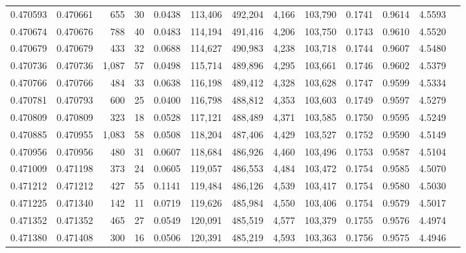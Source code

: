 \begin{tabular}{rrrrrrrrrrrrr}
0.470593 & 0.470661 &   655 &    30 &                                     0.0438 & 113,406 & 492,204 &   4,166 & 103,790 & 0.1741 & 0.9614 & 4.5593 \\
0.470674 & 0.470676 &   788 &    40 &                                     0.0483 & 114,194 & 491,416 &   4,206 & 103,750 & 0.1743 & 0.9610 & 4.5520 \\
0.470679 & 0.470679 &   433 &    32 &                                     0.0688 & 114,627 & 490,983 &   4,238 & 103,718 & 0.1744 & 0.9607 & 4.5480 \\
0.470736 & 0.470736 & 1,087 &    57 &                                     0.0498 & 115,714 & 489,896 &   4,295 & 103,661 & 0.1746 & 0.9602 & 4.5379 \\
0.470766 & 0.470766 &   484 &    33 &                                     0.0638 & 116,198 & 489,412 &   4,328 & 103,628 & 0.1747 & 0.9599 & 4.5334 \\
0.470781 & 0.470793 &   600 &    25 &                                     0.0400 & 116,798 & 488,812 &   4,353 & 103,603 & 0.1749 & 0.9597 & 4.5279 \\
0.470809 & 0.470809 &   323 &    18 &                                     0.0528 & 117,121 & 488,489 &   4,371 & 103,585 & 0.1750 & 0.9595 & 4.5249 \\
0.470885 & 0.470955 & 1,083 &    58 &                                     0.0508 & 118,204 & 487,406 &   4,429 & 103,527 & 0.1752 & 0.9590 & 4.5149 \\
0.470956 & 0.470956 &   480 &    31 &                                     0.0607 & 118,684 & 486,926 &   4,460 & 103,496 & 0.1753 & 0.9587 & 4.5104 \\
0.471009 & 0.471198 &   373 &    24 &                                     0.0605 & 119,057 & 486,553 &   4,484 & 103,472 & 0.1754 & 0.9585 & 4.5070 \\
0.471212 & 0.471212 &   427 &    55 &                                     0.1141 & 119,484 & 486,126 &   4,539 & 103,417 & 0.1754 & 0.9580 & 4.5030 \\
0.471225 & 0.471340 &   142 &    11 &                                     0.0719 & 119,626 & 485,984 &   4,550 & 103,406 & 0.1754 & 0.9579 & 4.5017 \\
0.471352 & 0.471352 &   465 &    27 &                                     0.0549 & 120,091 & 485,519 &   4,577 & 103,379 & 0.1755 & 0.9576 & 4.4974 \\
0.471380 & 0.471408 &   300 &    16 &                                     0.0506 & 120,391 & 485,219 &   4,593 & 103,363 & 0.1756 & 0.9575 & 4.4946 \\

\end{tabular}

